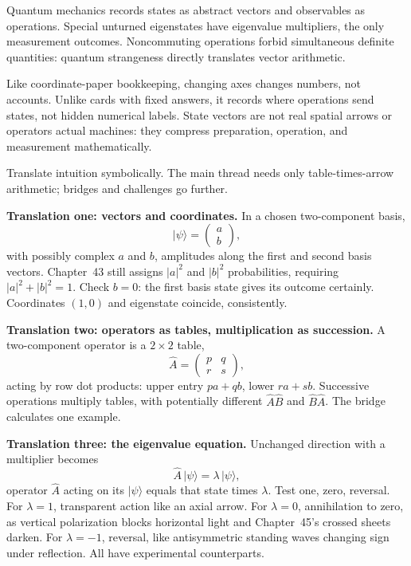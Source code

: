 
\begin{oneline}
Quantum mechanics records states as abstract vectors and observables as operations. Special unturned eigenstates have eigenvalue multipliers, the only measurement outcomes. Noncommuting operations forbid simultaneous definite quantities: quantum strangeness directly translates vector arithmetic.
\end{oneline}

Like coordinate-paper bookkeeping, changing axes changes numbers, not accounts. Unlike cards with fixed answers, it records where operations send states, not hidden numerical labels. State vectors are not real spatial arrows or operators actual machines: they compress preparation, operation, and measurement mathematically.


Translate intuition symbolically. The main thread needs only table-times-arrow arithmetic; bridges and challenges go further.

\textbf{Translation one: vectors and coordinates.} In a chosen two-component basis,
\[
|\psi\rangle=\begin{pmatrix} a \\ b \end{pmatrix},
\]
with possibly complex $a$ and $b$, amplitudes along the first and second basis vectors. Chapter~43 still assigns $|a|^2$ and $|b|^2$ probabilities, requiring $|a|^2+|b|^2=1$. Check $b=0$: the first basis state gives its outcome certainly. Coordinates $(1,0)$ and eigenstate coincide, consistently.

\textbf{Translation two: operators as tables, multiplication as succession.} A two-component operator is a $2\times2$ table,
\[
\hat{A}=\begin{pmatrix} p & q \\ r & s \end{pmatrix},
\]
acting by row dot products: upper entry $pa+qb$, lower $ra+sb$. Successive operations multiply tables, with potentially different $\hat{A}\hat{B}$ and $\hat{B}\hat{A}$. The bridge calculates one example.

\textbf{Translation three: the eigenvalue equation.} Unchanged direction with a multiplier becomes
\[
\hat{A}\,|\psi\rangle=\lambda\,|\psi\rangle,
\]
operator $\hat{A}$ acting on its $|\psi\rangle$ equals that state times $\lambda$. Test one, zero, reversal. For $\lambda=1$, transparent action like an axial arrow. For $\lambda=0$, annihilation to zero, as vertical polarization blocks horizontal light and Chapter~45's crossed sheets darken. For $\lambda=-1$, reversal, like antisymmetric standing waves changing sign under reflection. All have experimental counterparts.


